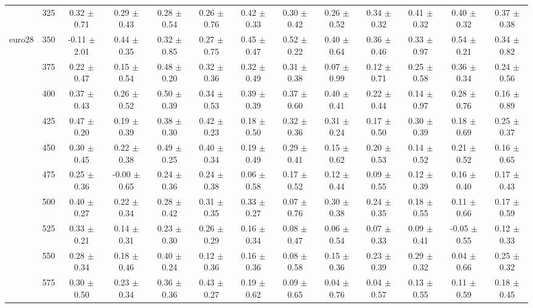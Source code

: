 \begin{table}[h]
{\begin{tabular}{
        ccccccccccccc}
 & 325& 0.32 $\pm$ 0.71& 0.29 $\pm$ 0.43& 0.28 $\pm$ 0.54& 0.26 $\pm$ 0.76& 0.42 $\pm$ 0.33& 0.30 $\pm$ 0.42& 0.26 $\pm$ 0.52& 0.34 $\pm$ 0.32& 0.41 $\pm$ 0.32& 0.40 $\pm$ 0.32& 0.37 $\pm$ 0.38 \\ 
\multirow{4}{*}{euro28}& 350& -0.11 $\pm$ 2.01& 0.44 $\pm$ 0.35& 0.32 $\pm$ 0.85& 0.27 $\pm$ 0.75& 0.45 $\pm$ 0.47& 0.52 $\pm$ 0.22& 0.40 $\pm$ 0.64& 0.36 $\pm$ 0.46& 0.33 $\pm$ 0.97& 0.54 $\pm$ 0.21& 0.34 $\pm$ 0.82 \\ 
 & 375& 0.22 $\pm$ 0.47& 0.15 $\pm$ 0.54& 0.48 $\pm$ 0.20& 0.32 $\pm$ 0.36& 0.32 $\pm$ 0.49& 0.31 $\pm$ 0.38& 0.07 $\pm$ 0.99& 0.12 $\pm$ 0.71& 0.25 $\pm$ 0.58& 0.36 $\pm$ 0.34& 0.24 $\pm$ 0.56 \\ 
 & 400& 0.37 $\pm$ 0.43& 0.26 $\pm$ 0.52& 0.50 $\pm$ 0.39& 0.34 $\pm$ 0.53& 0.39 $\pm$ 0.39& 0.37 $\pm$ 0.60& 0.40 $\pm$ 0.41& 0.22 $\pm$ 0.44& 0.14 $\pm$ 0.97& 0.28 $\pm$ 0.76& 0.16 $\pm$ 0.89 \\ 
 & 425& 0.47 $\pm$ 0.20& 0.19 $\pm$ 0.39& 0.38 $\pm$ 0.30& 0.42 $\pm$ 0.23& 0.18 $\pm$ 0.50& 0.32 $\pm$ 0.36& 0.31 $\pm$ 0.24& 0.17 $\pm$ 0.50& 0.30 $\pm$ 0.39& 0.18 $\pm$ 0.69& 0.25 $\pm$ 0.37 \\ 
 & 450& 0.30 $\pm$ 0.45& 0.22 $\pm$ 0.38& 0.49 $\pm$ 0.25& 0.40 $\pm$ 0.34& 0.19 $\pm$ 0.49& 0.29 $\pm$ 0.41& 0.15 $\pm$ 0.62& 0.20 $\pm$ 0.53& 0.14 $\pm$ 0.52& 0.21 $\pm$ 0.52& 0.16 $\pm$ 0.65 \\ 
 & 475& 0.25 $\pm$ 0.36& -0.00 $\pm$ 0.65& 0.24 $\pm$ 0.36& 0.24 $\pm$ 0.38& 0.06 $\pm$ 0.58& 0.17 $\pm$ 0.52& 0.12 $\pm$ 0.44& 0.09 $\pm$ 0.55& 0.12 $\pm$ 0.39& 0.16 $\pm$ 0.40& 0.17 $\pm$ 0.43 \\ 
 & 500& 0.40 $\pm$ 0.27& 0.22 $\pm$ 0.34& 0.28 $\pm$ 0.42& 0.31 $\pm$ 0.35& 0.33 $\pm$ 0.27& 0.07 $\pm$ 0.76& 0.30 $\pm$ 0.38& 0.24 $\pm$ 0.35& 0.18 $\pm$ 0.55& 0.11 $\pm$ 0.66& 0.17 $\pm$ 0.59 \\ 
 & 525& 0.33 $\pm$ 0.21& 0.14 $\pm$ 0.31& 0.23 $\pm$ 0.30& 0.26 $\pm$ 0.29& 0.16 $\pm$ 0.34& 0.08 $\pm$ 0.47& 0.06 $\pm$ 0.54& 0.07 $\pm$ 0.33& 0.09 $\pm$ 0.41& -0.05 $\pm$ 0.55& 0.12 $\pm$ 0.33 \\ 
 & 550& 0.28 $\pm$ 0.34& 0.18 $\pm$ 0.46& 0.40 $\pm$ 0.24& 0.12 $\pm$ 0.36& 0.16 $\pm$ 0.36& 0.08 $\pm$ 0.58& 0.15 $\pm$ 0.36& 0.23 $\pm$ 0.39& 0.29 $\pm$ 0.32& 0.04 $\pm$ 0.66& 0.25 $\pm$ 0.32 \\ 
 & 575& 0.30 $\pm$ 0.50& 0.23 $\pm$ 0.34& 0.36 $\pm$ 0.36& 0.43 $\pm$ 0.27& 0.19 $\pm$ 0.62& 0.09 $\pm$ 0.65& 0.04 $\pm$ 0.76& 0.04 $\pm$ 0.57& 0.13 $\pm$ 0.55& 0.11 $\pm$ 0.59& 0.18 $\pm$ 0.45 \\ 

\end{tabular}}
\end{table}
